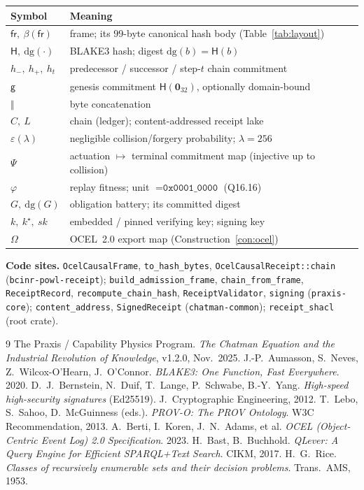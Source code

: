 \documentclass[11pt,oneside]{book}
\theoremstyle{definition}
\theoremstyle{plain}
\theoremstyle{remark}
\newcommand{\chainH}{\mathsf{H}}               %
\newcommand{\Fitness}{\varphi}
\newcommand{\dg}{\mathrm{dg}}                   %
\newcommand{\fr}{\mathsf{fr}}                   %
\newcommand{\body}{\beta}                       %
\newcommand{\code}[1]{\texttt{#1}}
\newcommand{\concat}{\mathbin{\Vert}}           %
\newcommand{\Genesis}{\mathsf{g}}               %
\newcommand{\Lake}{L}                 %
\newcommand{\Ledger}{C}               %
\begin{document}
\begin{tabular}{ll}
\toprule
Symbol & Meaning\\
\midrule
$\fr,\ \body(\fr)$ & frame; its $99$-byte canonical hash body (Table~\ref{tab:layout})\\
$\chainH,\ \dg(\cdot)$ & BLAKE3 hash; digest $\dg(b)=\chainH(b)$\\
$h_{-},\ h_{+},\ h_t$ & predecessor / successor / step-$t$ chain commitment\\
$\Genesis$ & genesis commitment $\chainH(\bm 0_{32})$, optionally domain-bound\\
$\concat$ & byte concatenation\\
$\Ledger,\ \Lake$ & chain (ledger); content-addressed receipt lake\\
$\varepsilon(\lambda)$ & negligible collision/forgery probability; $\lambda=256$\\
$\Psi$ & actuation $\mapsto$ terminal commitment map (injective up to collision)\\
$\Fitness$ & replay fitness; unit $=\code{0x0001\_0000}$ (Q16.16)\\
$G,\ \dg(G)$ & obligation battery; its committed digest\\
$k,\ k^{\star},\ sk$ & embedded / pinned verifying key; signing key\\
$\Omega$ & OCEL~2.0 export map (Construction~\ref{con:ocel})\\
\bottomrule
\end{tabular}

\vspace{1em}
\noindent\textbf{Code sites.} \code{OcelCausalFrame}, \code{to\_hash\_bytes},
\code{OcelCausalReceipt::chain} (\code{bcinr-powl-receipt});
\code{build\_admission\_frame}, \code{chain\_from\_frame}, \code{ReceiptRecord},
\code{recompute\_chain\_hash}, \code{ReceiptValidator}, \code{signing} (\code{praxis-core});
\code{content\_address}, \code{SignedReceipt} (\code{chatman-common}); \code{receipt\_shacl}
(root crate).

\begin{thebibliography}{9}
 The Praxis / Capability Physics Program.
\emph{The Chatman Equation and the Industrial Revolution of Knowledge}, v1.2.0, Nov.\ 2025.
 J.-P.\ Aumasson, S.\ Neves, Z.\ Wilcox-O'Hearn, J.\ O'Connor.
\emph{BLAKE3: One Function, Fast Everywhere}. 2020.
 D.\ J.\ Bernstein, N.\ Duif, T.\ Lange, P.\ Schwabe, B.-Y.\ Yang.
\emph{High-speed high-security signatures} (Ed25519). J.\ Cryptographic Engineering, 2012.
 T.\ Lebo, S.\ Sahoo, D.\ McGuinness (eds.).
\emph{PROV-O: The PROV Ontology}. W3C Recommendation, 2013.
 A.\ Berti, I.\ Koren, J.\ N.\ Adams, et al.
\emph{OCEL (Object-Centric Event Log) 2.0 Specification}. 2023.
 H.\ Bast, B.\ Buchhold.
\emph{QLever: A Query Engine for Efficient SPARQL+Text Search}. CIKM, 2017.
 H.\ G.\ Rice.
\emph{Classes of recursively enumerable sets and their decision problems}.
Trans.\ AMS, 1953.
\end{thebibliography}
\end{document}
